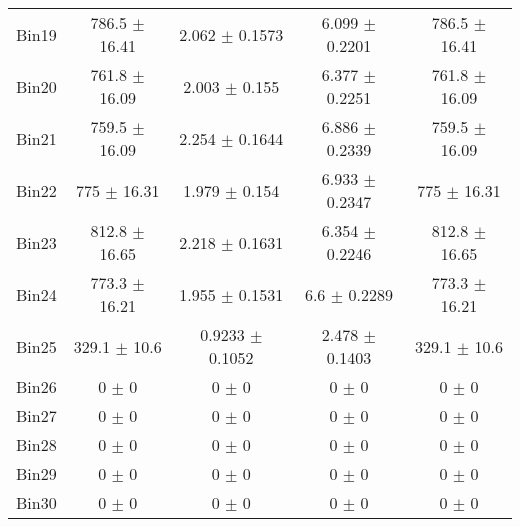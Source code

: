 \begin{tabular}{@{\extracolsep{4pt}}lcccc@{}}
     Bin19 & 786.5 $\pm$ 16.41 & 2.062 $\pm$ 0.1573 & 6.099 $\pm$ 0.2201 & 786.5 $\pm$ 16.41 \\ 
     Bin20 & 761.8 $\pm$ 16.09 & 2.003 $\pm$ 0.155 & 6.377 $\pm$ 0.2251 & 761.8 $\pm$ 16.09 \\ 
     Bin21 & 759.5 $\pm$ 16.09 & 2.254 $\pm$ 0.1644 & 6.886 $\pm$ 0.2339 & 759.5 $\pm$ 16.09 \\ 
     Bin22 & 775 $\pm$ 16.31 & 1.979 $\pm$ 0.154 & 6.933 $\pm$ 0.2347 & 775 $\pm$ 16.31 \\ 
     Bin23 & 812.8 $\pm$ 16.65 & 2.218 $\pm$ 0.1631 & 6.354 $\pm$ 0.2246 & 812.8 $\pm$ 16.65 \\ 
     Bin24 & 773.3 $\pm$ 16.21 & 1.955 $\pm$ 0.1531 & 6.6 $\pm$ 0.2289 & 773.3 $\pm$ 16.21 \\ 
     Bin25 & 329.1 $\pm$ 10.6 & 0.9233 $\pm$ 0.1052 & 2.478 $\pm$ 0.1403 & 329.1 $\pm$ 10.6 \\ 
     Bin26 & 0 $\pm$ 0 & 0 $\pm$ 0 & 0 $\pm$ 0 & 0 $\pm$ 0 \\ 
     Bin27 & 0 $\pm$ 0 & 0 $\pm$ 0 & 0 $\pm$ 0 & 0 $\pm$ 0 \\ 
     Bin28 & 0 $\pm$ 0 & 0 $\pm$ 0 & 0 $\pm$ 0 & 0 $\pm$ 0 \\ 
     Bin29 & 0 $\pm$ 0 & 0 $\pm$ 0 & 0 $\pm$ 0 & 0 $\pm$ 0 \\ 
     Bin30 & 0 $\pm$ 0 & 0 $\pm$ 0 & 0 $\pm$ 0 & 0 $\pm$ 0 \\ 
\hline\hline
  \end{tabular}
